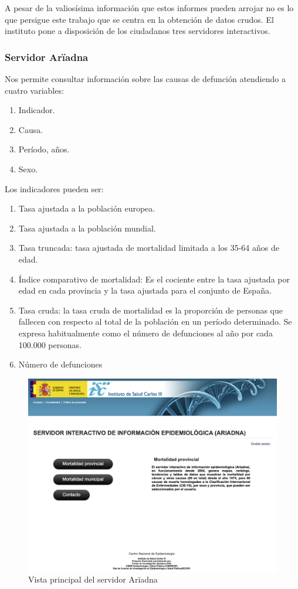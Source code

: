 A pesar de la valiosísima información que estos informes pueden arrojar no es lo que persigue este trabajo que se
centra en la obtención de datos crudos. El instituto pone a disposición de los ciudadanos tres servidores interactivos.

\subsubsection{Servidor Arïadna}
Nos permite consultar información sobre las causas de defunción atendiendo a cuatro variables:
\begin{enumerate}
  \item Indicador.
  \item Causa.
  \item Período, años.
  \item Sexo.
\end{enumerate}

Los indicadores pueden ser:
\begin{enumerate}
  \item Tasa ajustada a la población europea.
  \item Tasa ajustada a la población mundial.
  \item Tasa truncada: tasa ajustada de mortalidad limitada a los 35-64 años de edad.
  \item Índice comparativo de mortalidad: Es el cociente entre la tasa ajustada por edad en cada provincia y la tasa
  ajustada para el conjunto de España.
  \item Tasa cruda: la tasa cruda de mortalidad es la proporción de personas que fallecen con respecto al total
  de la población en un período determinado. Se expresa habitualmente como el número de defunciones al año
  por cada 100.000 personas.
  \item Número de defunciones
\end{enumerate}

\begin{figure}[]
	\centering
	\includegraphics[scale=0.5]{doc/logos/imgs/ariadna1.png}
	\caption{ \cite{ariadna} Vista principal del servidor Arïadna }
    \label{fig:worst_f_value}
\end{figure}

